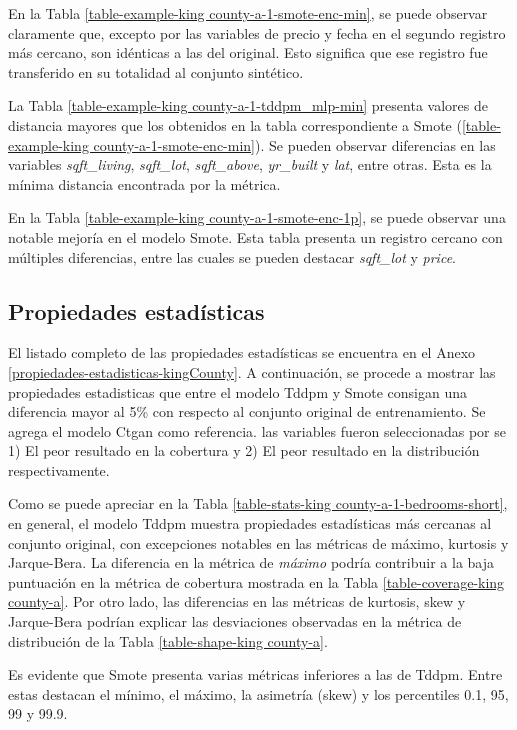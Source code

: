 En la Tabla \ref{table-example-king county-a-1-smote-enc-min}, se puede observar claramente que, excepto por las variables de precio y fecha en el segundo registro más cercano, son idénticas a las del original. Esto significa que ese registro fue transferido en su totalidad al conjunto sintético. 



\newpage
La Tabla \ref{table-example-king county-a-1-tddpm_mlp-min} presenta valores de distancia mayores que los obtenidos en la tabla correspondiente a Smote (\ref{table-example-king county-a-1-smote-enc-min}). Se pueden observar diferencias en las variables \emph{sqft\_living}, \emph{sqft\_lot}, \emph{sqft\_above}, \emph{yr\_built} y \emph{lat}, entre otras. Esta es la mínima distancia encontrada por la métrica.

\newpage
En la Tabla \ref{table-example-king county-a-1-smote-enc-1p}, se puede observar una notable mejoría en el modelo Smote. Esta tabla presenta un registro cercano con múltiples diferencias, entre las cuales se pueden destacar \emph{sqft\_lot} y \emph{price}.

\newpage
\subsection{Propiedades estadísticas}
El listado completo de las propiedades estadísticas se encuentra en el Anexo \ref{propiedades-estadisticas-kingCounty}. A continuación, se procede a mostrar las propiedades estadisticas que entre el modelo Tddpm y Smote consigan una diferencia mayor al 5\% con respecto al conjunto original de entrenamiento. Se agrega el modelo Ctgan como referencia. las variables fueron seleccionadas por se 1) El peor resultado en la cobertura y 2) El peor resultado en la distribución respectivamente.

Como se puede apreciar en la Tabla \ref{table-stats-king county-a-1-bedrooms-short}, en general, el modelo Tddpm muestra propiedades estadísticas más cercanas al conjunto original, con excepciones notables en las métricas de máximo, kurtosis y Jarque-Bera. La diferencia en la métrica de \emph{máximo} podría contribuir a la baja puntuación en la métrica de cobertura mostrada en la Tabla \ref{table-coverage-king county-a}. Por otro lado, las diferencias en las métricas de kurtosis, skew y Jarque-Bera podrían explicar las desviaciones observadas en la métrica de distribución de la Tabla \ref{table-shape-king county-a}.

\newpage
Es evidente que Smote presenta varias métricas inferiores a las de Tddpm. Entre estas destacan el mínimo, el máximo, la asimetría (skew) y los percentiles 0.1, 95, 99 y 99.9.

\newpage
